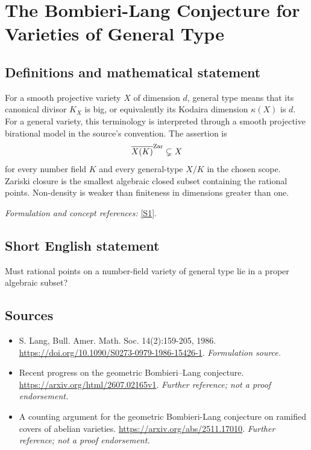 \documentclass[11pt]{article}
\begin{document}
\section*{\texorpdfstring{The Bombieri-Lang Conjecture for Varieties of General Type}{The Bombieri-Lang Conjecture for Varieties of General Type}}\label{55}
\subsection{Definitions and mathematical statement}
For a smooth projective variety $X$ of dimension $d$, general type means that its canonical divisor $K_X$ is big, or equivalently its Kodaira dimension $\kappa(X)$ is $d$. For a general variety, this terminology is interpreted through a smooth projective birational model in the source's convention. The assertion is
\[
 \overline{X(K)}^{\rm Zar}\subsetneq X
\]
for every number field $K$ and every general-type $X/K$ in the chosen scope. Zariski closure is the smallest algebraic closed subset containing the rational points. Non-density is weaker than finiteness in dimensions greater than one.
\par\smallskip\textit{Formulation and concept references:} \href{https://doi.org/10.1090/S0273-0979-1986-15426-1}{[S1]}.

\subsection{Short English statement}
Must rational points on a number-field variety of general type lie in a proper algebraic subset?
\subsection{Sources}
\begin{itemize}
\item[S1]S. Lang, Bull. Amer. Math. Soc. 14(2):159-205, 1986.
\url{https://doi.org/10.1090/S0273-0979-1986-15426-1}.
\textit{Formulation source.}
\item[S2]Recent progress on the geometric Bombieri–Lang conjecture.
\url{https://arxiv.org/html/2607.02165v1}.
\textit{Further reference; not a proof endorsement.}
\item[S3]A counting argument for the geometric Bombieri-Lang conjecture on ramified covers of abelian varieties.
\url{https://arxiv.org/abs/2511.17010}.
\textit{Further reference; not a proof endorsement.}
\end{itemize}
\end{document}
